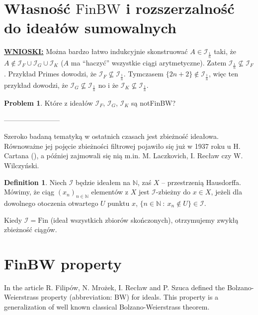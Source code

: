 \documentclass{amsart}
\theoremstyle{definition}
\newtheorem{problem}{Problem}
\newtheorem{df}{Definition}
\theoremstyle{definition}
\newcommand{\N}{{\mathbb N}}
\newcommand{\Fin}{\textrm{Fin}}
\newcommand{\I}{\mathcal I}
\newcommand{\finbw}{\text{FinBW}}
\begin{document}
    \color{purple}
		
\section{Własność $\finbw$ i rozszerzalność do ideałów sumowalnych}

\textbf{\underline{WNIOSKI:}} 
Można bardzo łatwo indukcyjnie skonstruować $A\in \I_{\frac{1}{n}}$ taki, że $A\notin \I_F\cup\I_G\cup\I_K$ ($A$ ma "`haczyć"' wszystkie ciągi arytmetyczne). Zatem $\I_{\frac{1}{n}} \nsubseteq \I_F$. Przykład Primes dowodzi, że $\I_F \nsubseteq \I_{\frac{1}{n}}$. Tymczasem $\{2n+2\}\notin\I_{\frac{1}{n}}$, więc ten przykład dowodzi, że $\I_G \nsubseteq \I_{\frac{1}{n}}$ no i że $\I_K \nsubseteq \I_{\frac{1}{n}}$.

\begin{problem}
Które z ideałów $\I_F$, $\I_G$, $\I_K$ są notFinBW?
\end{problem}

------------------------
\color{teal}

Szeroko badaną tematyką w ostatnich czasach jest zbieżność ideałowa. Równoważne jej pojęcie zbieżności filtrowej pojawiło się już w 1937 roku u H. Cartana (\cite{cartan}), a później zajmowali się nią m.in. M. Laczkovich, I. Recław czy W. Wilczyński.  
\begin{df}
Niech $\I$ będzie ideałem na $\N$, zaś $X$ -- przestrzenią Hausdorffa. Mówimy, że ciąg $(x_n)_{n\in\N}$ elementów z $X$ jest $\I$-zbieżny do $x\in X$, jeżeli dla dowolnego otoczenia otwartego $U$ punktu $x$, $\{n\in \N\ :\ x_n\not\in U  \}\in\I$. %
\end{df}
Kiedy $\I=\Fin$ (ideał wszystkich zbiorów skończonych), otrzymujemy zwykłą zbieżność ciągów.


\color{black}
\section{FinBW property}

In the article \cite{H1} R. Filipów, N. Mrożek, I. Recław and P. Szuca 
defined the Bolzano-Weierstrass property (abbreviation: BW) 
for ideals. This property is a generalization
of well known classical Bolzano-Weierstrass theorem.
\end{document}
